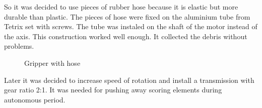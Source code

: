 	So it was decided to use pieces of rubber hose because it is elastic but more durable than plastic. The pieces of hose were fixed on the aluminium tube from Tetrix set with screws. The tube was instaled on the shaft of the motor instead of the axis. This construction worked well enough. It collected the debris without problems.  
	\begin{figure}[H]
		\begin{minipage}[h]{\linewidth}
			\caption{Gripper with hose}
		\end{minipage}
	\end{figure}
	Later it was decided to increase speed of rotation and install a transmission with gear ratio 2:1. It was needed for pushing away scoring elements during autonomous period.
